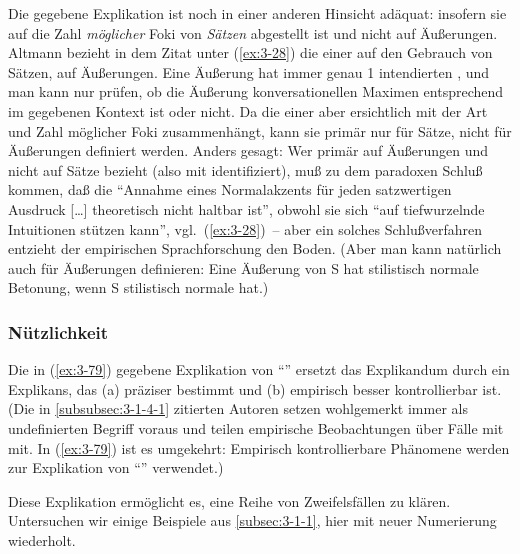 \documentclass[output=paper]{langsci/langscibook}
\begin{document}
Die gegebene Explikation ist noch in einer anderen Hinsicht adäquat:
insofern sie auf die Zahl \textit{möglicher} Foki von \textit{Sätzen}
abgestellt ist und nicht auf Äußerungen. Altmann bezieht in dem Zitat
unter (\ref{ex:3-28}) die  einer  auf den Gebrauch von
Sätzen, \dash auf Äußerungen. Eine Äußerung hat immer genau 1
intendierten , und man kann nur prüfen, ob die Äußerung
konversationellen Maximen entsprechend im gegebenen Kontext
 ist oder nicht. Da die  einer
 aber ersichtlich mit der Art und Zahl möglicher Foki
zusammenhängt, kann sie primär nur für Sätze, nicht für Äußerungen
definiert werden. Anders gesagt: Wer  primär
auf Äußerungen und nicht auf Sätze bezieht (also mit
 identifiziert), muß zu dem paradoxen
Schluß kommen, daß die "`Annahme eines Normalakzents für jeden
satzwertigen Ausdruck [\ldots] theoretisch nicht haltbar ist"', obwohl
sie sich "`auf tiefwurzelnde Intuitionen stützen kann"', vgl.\ (\ref{ex:3-28})~--
aber ein solches Schlußverfahren entzieht der empirischen
Sprachforschung den Boden. (Aber man kann 
natürlich auch für Äußerungen definieren: Eine Äußerung von S hat
stilistisch normale Betonung, wenn S stilistisch normale
 hat.)

\subsubsection{Nützlichkeit}
\label{subsubsec:3-1-4-2}

Die in (\ref{ex:3-79}) gegebene Explikation von "`"' ersetzt das
Explikandum durch ein Explikans, das (a) präziser bestimmt und (b)
empirisch besser kontrollierbar ist. (Die in \ref{subsubsec:3-1-4-1} zitierten Autoren
setzen wohlgemerkt  immer als undefinierten
Begriff voraus und teilen empirische Beobachtungen über Fälle mit
 mit. In (\ref{ex:3-79}) ist es umgekehrt: Empirisch
kontrollierbare Phänomene werden zur Explikation von "`"'
verwendet.)

Diese Explikation ermöglicht es, eine Reihe von Zweifelsfällen zu
klären. Untersuchen wir einige Beispiele aus \ref{subsec:3-1-1}, hier mit neuer
Numerierung wiederholt.
\end{document}
